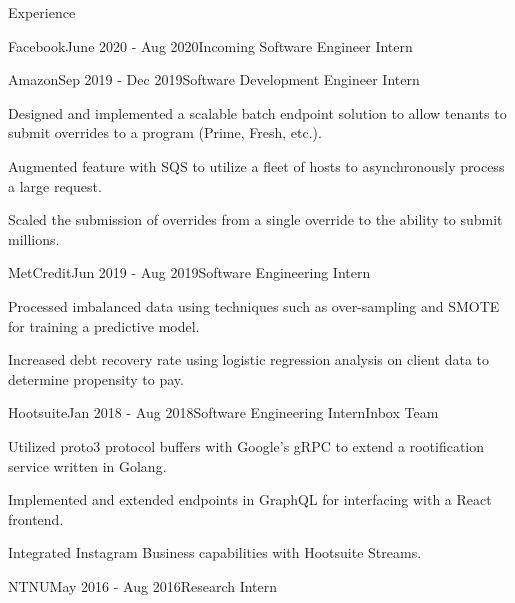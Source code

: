 \documentclass{resume} %
\begin{document}
\begin{rSection}{Experience}

\begin{rSubsection}{Facebook}{June 2020 - Aug 2020}{Incoming Software Engineer Intern}{}
\end{rSubsection}

\begin{rSubsection}{Amazon}{Sep 2019 - Dec 2019}{Software Development Engineer Intern}{}
\item Designed and implemented a scalable batch endpoint solution to allow tenants to submit overrides to a program (Prime, Fresh, etc.).
\item Augmented feature with SQS to utilize a fleet of hosts to asynchronously process a large request.
\item Scaled the submission of overrides from a single override to the ability to submit millions.
\end{rSubsection}

\begin{rSubsection}{MetCredit}{Jun 2019 - Aug 2019}{Software Engineering Intern}{}
\item Processed imbalanced data using techniques such as over-sampling and SMOTE for training a predictive model.
\item Increased debt recovery rate using logistic regression analysis on client data to determine propensity to pay.
\end{rSubsection}

\begin{rSubsection}{Hootsuite}{Jan 2018 - Aug 2018}{Software Engineering Intern}{Inbox Team}
\item Utilized proto3 protocol buffers with Google's gRPC to extend a rootification service written in Golang.
\item Implemented and extended endpoints in GraphQL for interfacing with a React frontend.
\item Integrated Instagram Business capabilities with Hootsuite Streams.
\end{rSubsection}

\begin{rSubsection}{NTNU}{May 2016 - Aug 2016}{Research Intern}{}
\end{rSubsection}
\end{rSection}
\end{document}
